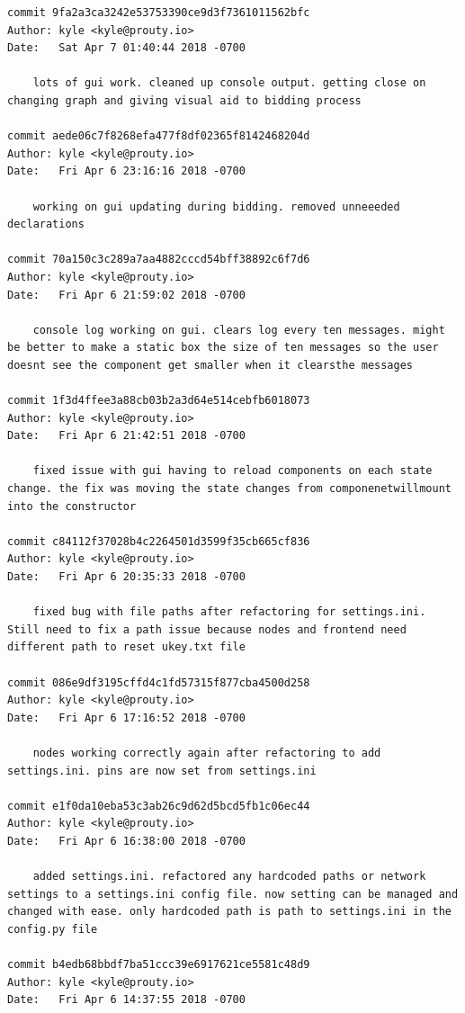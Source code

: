 \documentclass[draftclsnofoot, onecolumn, compsoc, 10pt]{IEEEtran}
\begin{document}
\begin{lstlisting}
commit 9fa2a3ca3242e53753390ce9d3f7361011562bfc 
Author: kyle <kyle@prouty.io> 
Date:   Sat Apr 7 01:40:44 2018 -0700 

    lots of gui work. cleaned up console output. getting close on changing graph and giving visual aid to bidding process 

commit aede06c7f8268efa477f8df02365f8142468204d 
Author: kyle <kyle@prouty.io> 
Date:   Fri Apr 6 23:16:16 2018 -0700 

    working on gui updating during bidding. removed unneeeded declarations 

commit 70a150c3c289a7aa4882cccd54bff38892c6f7d6 
Author: kyle <kyle@prouty.io> 
Date:   Fri Apr 6 21:59:02 2018 -0700 

    console log working on gui. clears log every ten messages. might be better to make a static box the size of ten messages so the user doesnt see the component get smaller when it clearsthe messages 

commit 1f3d4ffee3a88cb03b2a3d64e514cebfb6018073 
Author: kyle <kyle@prouty.io> 
Date:   Fri Apr 6 21:42:51 2018 -0700 

    fixed issue with gui having to reload components on each state change. the fix was moving the state changes from componenetwillmount into the constructor 

commit c84112f37028b4c2264501d3599f35cb665cf836 
Author: kyle <kyle@prouty.io> 
Date:   Fri Apr 6 20:35:33 2018 -0700 

    fixed bug with file paths after refactoring for settings.ini. Still need to fix a path issue because nodes and frontend need different path to reset ukey.txt file 

commit 086e9df3195cffd4c1fd57315f877cba4500d258 
Author: kyle <kyle@prouty.io> 
Date:   Fri Apr 6 17:16:52 2018 -0700 

    nodes working correctly again after refactoring to add settings.ini. pins are now set from settings.ini 

commit e1f0da10eba53c3ab26c9d62d5bcd5fb1c06ec44 
Author: kyle <kyle@prouty.io> 
Date:   Fri Apr 6 16:38:00 2018 -0700 

    added settings.ini. refactored any hardcoded paths or network settings to a settings.ini config file. now setting can be managed and changed with ease. only hardcoded path is path to settings.ini in the config.py file 

commit b4edb68bbdf7ba51ccc39e6917621ce5581c48d9 
Author: kyle <kyle@prouty.io> 
Date:   Fri Apr 6 14:37:55 2018 -0700 


\end{lstlisting}
\end{document}
